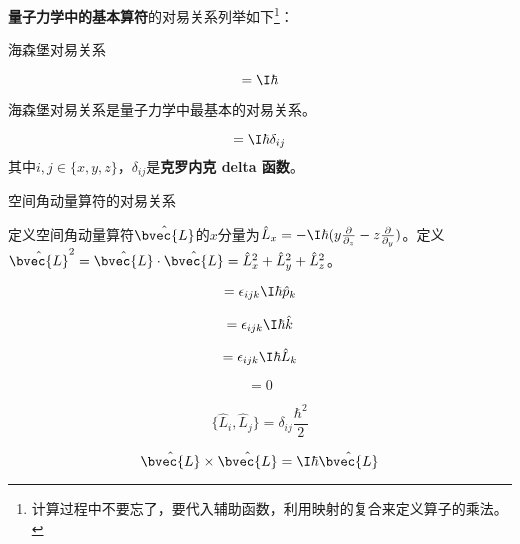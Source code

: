 \textbf{量子力学中的基本算符}的对易关系列举如下\footnote{计算过程中不要忘了，要代入辅助函数，利用映射的复合来定义算子的乘法。}：

\begin{theorem}{海森堡对易关系}\label{the_ComOpQ_5}

\begin{equation}
[\hat{x}, \hat{p}_x] = \I\hbar
\end{equation}

\end{theorem}



海森堡对易关系是量子力学中最基本的对易关系。



\begin{corollary}{}\label{cor_ComOpQ_1}

\begin{equation}
[\hat{i}, \hat{p}_j]=\I\hbar\delta_{ij}
\end{equation}
其中$i, j\in\{x, y, z\}$，$\delta_{ij}$是\textbf{克罗内克 delta 函数}。
\end{corollary}

\begin{theorem}{空间角动量算符的对易关系}\label{the_ComOpQ_6}

定义空间角动量算符$\hat{\bvec{L}}$的$x$分量为$\hat{L}_x=-\I\hbar(y\frac{\partial}{\partial_z}-z\frac{\partial}{\partial _y})$。定义$\hat{\bvec{L}}^2=\hat{\bvec{L}}\cdot \hat{\bvec{L}}=\hat{L}_x^2+\hat{L}_y^2+\hat{L}_z^2$。


\begin{equation}
[\hat{p}_i, \hat{L}_j]=\epsilon_{ijk}\I\hbar\hat{p}_k
\end{equation}


\begin{equation}
[\hat{i}, \hat{L}_j]=\epsilon_{ijk}\I\hbar\hat{k}
\end{equation}



\begin{equation}
[\hat{L}_i, \hat{L}_j]=\epsilon_{ijk}\I\hbar\hat{L}_k
\end{equation}

\begin{equation}
[\hat{\bvec{L}}^2, \hat{L}_i]=0
\end{equation}

\begin{equation}
\{\hat{L}_i, \hat{L}_j\}=\delta_{ij}\frac{\hbar^2}{2}
\end{equation}

\begin{equation}
\hat{\bvec{L}}\times\hat{\bvec{L}}=\I\hbar \hat{\bvec{L}}
\end{equation}

\end{theorem}




